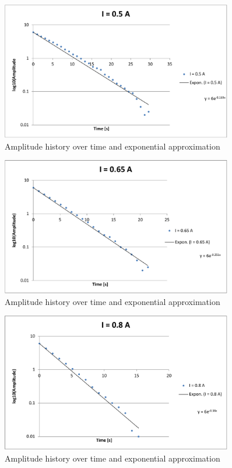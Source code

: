 \documentclass{scrreprt}
\begin{document}
\begin{figure}[H]
	\centering
  \includegraphics[width=0.9\textwidth]{diag/5A.pdf}
	\caption{Amplitude history over time and exponential approximation}
	\label{fig:0.5A}
\end{figure}

\begin{figure}[H]
	\centering
  \includegraphics[width=0.9\textwidth]{diag/65A.pdf}
	\caption{Amplitude history over time and exponential approximation}
	\label{fig:0.65A}
\end{figure}

\begin{figure}[H]
	\centering
  \includegraphics[width=0.9\textwidth]{diag/8A.pdf}
	\caption{Amplitude history over time and exponential approximation}
	\label{fig:0.8A}
\end{figure}
\end{document}
